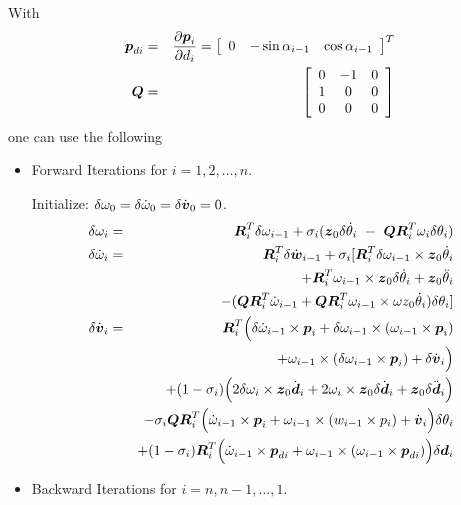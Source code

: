 With
\begin{eqnarray}
\mbold{p}_{di} & = & \dfdx{\mbold{p}_i}{d_i} = \matr{ccc}{ 0 & -\sin\alpha_{i-1} & \cos\alpha_{i-1}}^T \\
\mbold{Q} & = & \matr{ccc}{
0 & -1 & 0  \\
1 & 0 & 0  \\
0 & 0 & 0 }
\end{eqnarray}
one can use the following
\begin{itemize}
\item Forward Iterations for $i=1, 2, \ldots, n$. 

Initialize: $\delta \omega_0 = \delta \dot{\omega}_0 = \delta \dot{\mbold{v}}_0 = 0$.
\begin{eqnarray}
\delta \omega_i & = & \mbold{R}_i^T \delta \omega_{i-1} + \sigma_i
(\mbold{z}_0 \delta \dot{\theta}_i\ -\ \mbold{QR}_i^T \omega_i \delta \theta_i) \\
\delta \dot{\omega}_i  & = & \mbold{R}_i^T \delta \dot{\mbold{w}}_{i-1} +
\sigma_i [\mbold{R}_i^T \delta \omega_{i-1} \times \mbold{z}_0
\dot{\theta}_i \\ \nonumber
& & + \mbold{R}_i^T \omega_{i-1} \times \mbold{z}_0 \delta \dot{\theta}_i  
+ \mbold{z}_0 \ddot{\theta}_i \\ \nonumber
& & - (\mbold{QR}_i^T \dot{\omega}_{i-1} + \mbold{QR}_i^T \omega_{i-1}
\times \omega{z}_0 \dot{\theta}_i) \delta \theta_i ] \\
\delta \dot{\mbold{v}}_i & = & \mbold{R}_i^T\Big(\delta
\dot{\omega}_{i-1} \times \mbold{p}_i + \delta \omega_{i-1}
\times(\omega_{i-1} \times \mbold{p}_i) \\ \nonumber
& & + \omega_{i-1} \times( \delta \omega_{i-1} \times \mbold{p}_i) +
\delta \dot{\mbold{v}}_i\Big) \\ \nonumber
& & + (1-\sigma_i)\Big(2\delta \omega_i \times \mbold{z}_0\dot{\mbold{d}}_i
+ 2\omega_i \times \mbold{z}_0 \delta \dot{\mbold{d}}_i + \mbold{z}_0
\delta \ddot{\mbold{d}}_i\Big) \\ \nonumber
& & - \sigma_i\mbold{QR}_i^T \Big(\dot{\omega}_{i-1} \times
\mbold{p}_i + \omega_{i-1} \times(w_{i-1}\times p_i)
+ \dot{\mbold{v}}_i\Big) \delta \theta_i \\ \nonumber
& & + (1-\sigma_i) \mbold{R}_i^T \Big(\dot{\omega}_{i-1} \times
\mbold{p}_{di} + \omega_{i-1} \times(\omega_{i-1}\times
\mbold{p}_{di})\Big) \delta \mbold{d}_i
\end{eqnarray}

\item Backward Iterations for $i=n, n-1, \ldots, 1$. 


\end{itemize}
